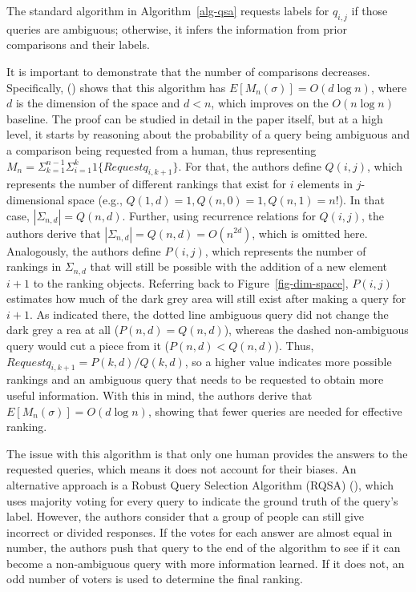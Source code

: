 \documentclass[
  letterpaper,
  numbers=noenddot,
  DIV=11]{scrreprt}
\theoremstyle{definition}
\theoremstyle{plain}
\theoremstyle{plain}
\theoremstyle{remark}
\begin{document}
The standard algorithm in  Algorithm~\ref{alg-qsa}  requests labels for
\(q_{i,j}\) if those queries are ambiguous; otherwise, it infers the
information from prior comparisons and their labels.

It is important to demonstrate that the number of comparisons decreases.
Specifically, () shows that
this algorithm has \(E[M_n(\sigma)] = O(d\log n)\), where \(d\) is the
dimension of the space and \(d < n\), which improves on the
\(O(n\log n)\) baseline. The proof can be studied in detail in the paper
itself, but at a high level, it starts by reasoning about the
probability of a query being ambiguous and a comparison being requested
from a human, thus representing
\(M_n = \Sigma_{k=1}^{n-1}\Sigma_{i=1}^k 1\{Requestq_{i,k+1}\}\). For
that, the authors define \(Q(i,j)\), which represents the number of
different rankings that exist for \(i\) elements in \(j\)-dimensional
space (e.g., \(Q(1,d) = 1, Q(n,0) = 1, Q(n,1) = n!\)). In that case,
\(|\Sigma_{n,d}| = Q(n,d)\). Further, using recurrence relations for
\(Q(i,j)\), the authors derive that
\(|\Sigma_{n,d}| = Q(n,d) = O(n^{2d})\), which is omitted here.
Analogously, the authors define \(P(i,j)\), which represents the number
of rankings in \(\Sigma_{n,d}\) that will still be possible with the
addition of a new element \(i+1\) to the ranking objects. Referring back
to Figure~\ref{fig-dim-space}, \(P(i,j)\) estimates how much of the dark
grey area will still exist after making a query for \(i+1\). As
indicated there, the dotted line ambiguous query did not change the dark
grey a rea at all (\(P(n,d) = Q(n,d)\)), whereas the dashed
non-ambiguous query would cut a piece from it (\(P(n,d) < Q(n,d)\)).
Thus, \(Request q_{i,k+1} = P(k,d) / Q(k,d)\), so a higher value
indicates more possible rankings and an ambiguous query that needs to be
requested to obtain more useful information. With this in mind, the
authors derive that \(E[M_n(\sigma)] = O(d\log n)\), showing that fewer
queries are needed for effective ranking.

The issue with this algorithm is that only one human provides the
answers to the requested queries, which means it does not account for
their biases. An alternative approach is a Robust Query Selection
Algorithm (RQSA) (), which
uses majority voting for every query to indicate the ground truth of the
query's label. However, the authors consider that a group of people can
still give incorrect or divided responses. If the votes for each answer
are almost equal in number, the authors push that query to the end of
the algorithm to see if it can become a non-ambiguous query with more
information learned. If it does not, an odd number of voters is used to
determine the final ranking.
\end{document}
